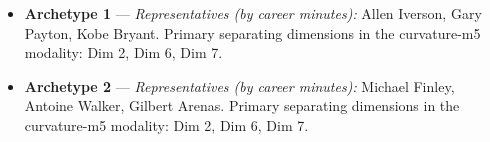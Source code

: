 \begin{itemize}
\item \textbf{Archetype 1} --- \emph{Representatives (by career minutes):} Allen Iverson, Gary Payton, Kobe Bryant. Primary separating dimensions in the curvature-m5 modality: Dim 2, Dim 6, Dim 7.
\item \textbf{Archetype 2} --- \emph{Representatives (by career minutes):} Michael Finley, Antoine Walker, Gilbert Arenas. Primary separating dimensions in the curvature-m5 modality: Dim 2, Dim 6, Dim 7.
\end{itemize}
